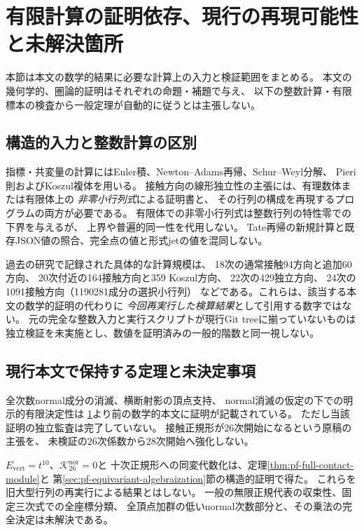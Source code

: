 \section{有限計算の証明依存、現行の再現可能性と未解決箇所}
\label{sec:finite-calculation-scope}

本節は本文の数学的結果に必要な計算上の入力と検証範囲をまとめる。
本文の幾何学的、圏論的証明はそれぞれの命題・補題で与え、
以下の整数計算・有限標本の検査から一般定理が自動的に従うとは主張しない。

\subsection{構造的入力と整数計算の区別}
指標・共変量の計算にはEuler積、Newton--Adams再帰、Schur--Weyl分解、
Pieri則およびKoszul複体を用いる。
接触方向の線形独立性の主張には、有理数体または有限体上の
\emph{非零小行列式}による証明書と、
その行列の構成を再現するプログラムの両方が必要である。
有限体での非零小行列式は整数行列の特性零での下界を与えるが、
上界や普遍的同一性を代用しない。
Tate再帰の新規計算と既存JSON値の照合、完全点の値と形式jetの値を混同しない。

過去の研究で記録された具体的な計算規模は、
18次の通常接触94方向と追加60方向、
20次付近の164接触方向と359 Koszul方向、
22次の429独立方向、
24次の1091接触方向（1190281成分の選択小行列）
などである。これらは、該当する本文の数学的証明の代わりに
\emph{今回再実行した検算結果}として引用する数字ではない。
元の完全な整数入力と実行スクリプトが現行Git treeに揃っていないものは
独立検証を未実施とし、数値を証明済みの一般的階数と同一視しない。

\subsection{現行本文で保持する定理と未決定事項}
全次数normal成分の消滅、横断射影の頂点支持、
normal消滅の仮定の下での明示的有限決定性は
\ref{sec:finite-calculation-scope}より前の数学的本文に証明が記載されている。
ただし当該証明の独立監査は完了していない。
接触正規形が26次開始になるという原稿の主張を、
未検証の26次係数から28次開始へ強化しない。

$E_{\mathrm{vert}}=t^{10}$、$\mathcal K_{26}^{\mathrm{nor}}=0$と
十次正規形への同変代数化は、定理\ref{thm:pf-full-contact-module}と
第\ref{sec:pf-equivariant-algebraization}節の構造的証明で得た。
これらを旧大型行列の再実行による結果とはしない。
一般の無限正規代表の収束性、固定三次式での全座標分類、
全頂点加群の低いnormal次数部分と、その乗法の完全決定は未解決である。

